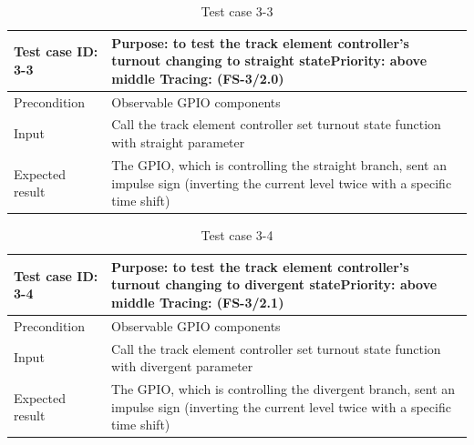 \begin{table}[H]
	\caption{Test case 3-3}
	\label{table:TCase-FS3-3}
	\begin{center}
		\renewcommand{\arraystretch}{1.8}
		\begin{tabu} 
			to 0.9 \textwidth
			{  X[0.4, c] X[c] }
			\toprule
			Test case ID: 3-3 & Purpose: to test the track element controller's turnout changing to straight state\newline Priority: above middle \newline Tracing: (FS-3/2.0) \\ \midrule
			Precondition      & Observable GPIO components                                                                                                                     \\
			Input             & Call the track element controller set turnout state function with straight parameter                                                           \\
			Expected result   & The GPIO, which is controlling the straight branch, sent an impulse sign (inverting the current level twice with a specific time shift)     \\ \bottomrule
		\end{tabu}
	\end{center}
\end{table}

\begin{table}[H]
	\caption{Test case 3-4}
	\label{table:TCase-FS3-4}
	\begin{center}
		\renewcommand{\arraystretch}{1.8}
		\begin{tabu} 
			to 0.9 \textwidth
			{  X[0.4, c] X[c] }
			\toprule
			Test case ID: 3-4 & Purpose: to test the track element controller's turnout changing to divergent state\newline Priority: above middle \newline Tracing: (FS-3/2.1) \\ \midrule
			Precondition      & Observable GPIO components                                                                                                                      \\
			Input             & Call the track element controller set turnout state function with divergent parameter                                                           \\
			Expected result   & The GPIO, which is controlling the divergent branch, sent an impulse sign (inverting the current level twice with a specific time shift)        \\ \bottomrule
		\end{tabu}
	\end{center}
\end{table}

